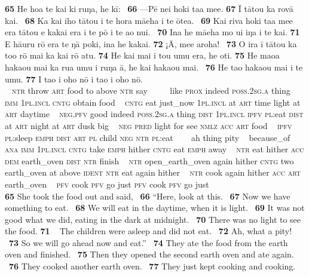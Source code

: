 {\bigskip\gll
\textbf{\textup{65}} He hoa te kai ki ruŋa, he kī: ~\textbf{\textup{66}} —Pē nei hoki ta{\ꞌ}a me{\ꞌ}e. \textbf{\textup{67}} {\ꞌ}\=I tātou ka rovā kai. ~\textbf{\textup{68}} Ka kai iho tātou {\ꞌ}i te hora mā{\ꞌ}eha {\ꞌ}i te {\ꞌ}ōtea. ~\textbf{\textup{69}} Kai riva hoki ta{\ꞌ}a me{\ꞌ}e era tātou e kakai era {\ꞌ}i te pō {\ꞌ}i te {\ꞌ}ao nui. ~\textbf{\textup{70}} {\ꞌ}Ina he mā{\ꞌ}eha mo u{\ꞌ}i iŋa i te kai. \textbf{\textup{71}} E hā{\ꞌ}uru rō era te ŋā poki, {\ꞌ}ina he kakai. \textbf{\textup{72}} ¡{\ꞌ}\=A, me{\ꞌ}e {\ꞌ}aroha! ~\textbf{\textup{73}} {\ꞌ}O ira {\ꞌ}ī tātou ka to{\ꞌ}o rō mai ka kai rō atu. \textbf{\textup{74}} He kai mai i tou {\ꞌ}umu era, he oti. \textbf{\textup{75}} He ma{\ꞌ}oa haka{\ꞌ}ou mai ka rua {\ꞌ}umu {\ꞌ}i ruŋa {\ꞌ}ā, he kai haka{\ꞌ}ou mai. ~\textbf{\textup{76}} He ta{\ꞌ}o haka{\ꞌ}ou mai i te {\ꞌ}umu. \textbf{\textup{77}} I ta{\ꞌ}o i oho nō i ta{\ꞌ}o i oho nō.\\
~ \textsc{ntr} throw \textsc{art} food to above \textsc{ntr} say ~ ~~~like \textsc{prox} indeed \textsc{poss.2sg.a} thing  ~ \textsc{imm} \textsc{1pl.incl} \textsc{cntg} obtain food ~ \textsc{cntg} eat just\_now \textsc{1pl.incl} at \textsc{art} time light at \textsc{art} daytime ~ \textsc{neg.pfv} good indeed \textsc{poss.2sg.a} thing \textsc{dist} \textsc{1pl.incl} \textsc{ipfv} \textsc{pl}:eat \textsc{dist} at \textsc{art} night at \textsc{art} dusk big ~ \textsc{neg} \textsc{pred} light for see \textsc{nmlz} \textsc{acc} \textsc{art} food  ~ \textsc{ipfv} \textsc{pl}:sleep \textsc{emph} \textsc{dist} \textsc{art} \textsc{pl} child \textsc{neg} \textsc{ntr} \textsc{pl}:eat  ~ ~~ah thing pity ~ because\_of \textsc{ana} \textsc{imm} \textsc{1pl.incl} \textsc{cntg} take \textsc{emph} hither \textsc{cntg} eat \textsc{emph} away ~ \textsc{ntr} eat hither \textsc{acc} \textsc{dem} earth\_oven \textsc{dist} \textsc{ntr} finish  ~ \textsc{ntr} open\_earth\_oven again hither \textsc{cntg} two earth\_oven at above \textsc{ident} \textsc{ntr} eat again hither ~ \textsc{ntr} cook again hither \textsc{acc} \textsc{art} earth\_oven  ~ \textsc{pfv} cook \textsc{pfv} go just \textsc{pfv} cook \textsc{pfv} go just\\

\medskip\glt
\textbf{\textup{65}} She took the food out and said, ~\textbf{\textup{66}} “Here, look at this. ~\textbf{\textup{67}} Now we have something to eat. ~\textbf{\textup{68}} We will eat in the daytime, when it is light. ~\textbf{\textup{69}} It was not good what we did, eating in the dark at midnight. ~\textbf{\textup{70}} There was no light to see the food. \textbf{\textup{71~~}}The children were asleep and did not eat. ~\textbf{\textup{72}} Ah, what a pity! ~\textbf{\textup{73}} So we will go ahead now and eat.” ~\textbf{\textup{74}} They ate the food from the earth oven and finished. ~\textbf{\textup{75}} Then they opened the second earth oven and ate again. ~\textbf{\textup{76}} They cooked another earth oven. ~\textbf{\textup{77}} They just kept cooking and cooking.


}

